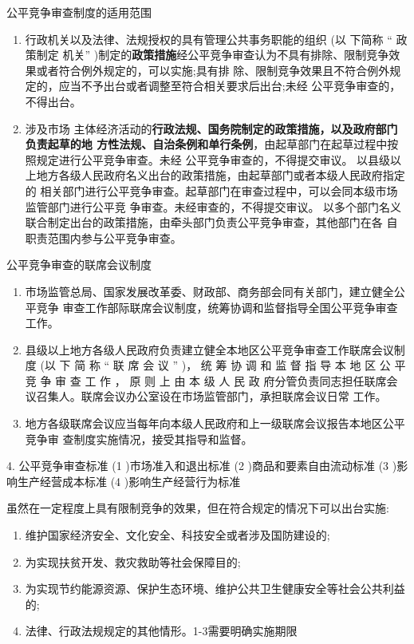 \documentclass[UTF8,12pt]{ctexart}
\numberwithin{equation}{section} %
\numberwithin{figure}{section}
\numberwithin{table}{section}
\begin{document}
	公平竞争审查制度的适用范围
	\begin{enumerate}
		\item 行政机关以及法律、法规授权的具有管理公共事务职能的组织 (以 下简称 “ 政策制定 机关” )制定的\textbf{政策措施}经公平竞争审查认为不具有排除、限制竞争效果或者符合例外规定的，可以实施;具有排 除、限制竞争效果且不符合例外规定的，应当不予出台或者调整至符合相关要求后出台;未经 公平竞争审查的，不得出台。
		
		\item 涉及市场 主体经济活动的\textbf{行政法规、国务院制定的政策措施，以及政府部门负责起草的地 方性法规、自治条例和单行条例}，由起草部门在起草过程中按照规定进行公平竞争审查。未经 公平竞争审查的，不得提交审议。 以县级以上地方各级人民政府名义出台的政策措施，由起草部门或者本级人民政府指定的 相关部门进行公平竞争审查。起草部门在审查过程中，可以会同本级市场监管部门进行公平竞 争审查。未经审查的，不得提交审议。 以多个部门名义联合制定出台的政策措施，由牵头部门负责公平竞争审查，其他部门在各 自职责范围内参与公平竞争审查。
	\end{enumerate}
	
	
	公平竞争审查的联席会议制度
	\begin{enumerate}
		\item 市场监管总局、国家发展改革委、财政部、商务部会同有关部门，建立健全公平竞争 审查工作部际联席会议制度，统筹协调和监督指导全国公平竞争审查工作。
		
		\item 县级以上地方各级人民政府负责建立健全本地区公平竞争审查工作联席会议制度 (以 下 简 称 “ 联 席 会 议 ” )， 统 筹 协 调 和 监 督 指 导 本 地 区 公 平 竞 争 审 查 工 作 ， 原 则 上 由 本 级 人 民 政 府分管负责同志担任联席会议召集人。联席会议办公室设在市场监管部门，承担联席会议日常 工作。
		
		\item 地方各级联席会议应当每年向本级人民政府和上一级联席会议报告本地区公平竞争审 查制度实施情况，接受其指导和监督。
	\end{enumerate}
	
	4. 公平竞争审查标准
	(1 )市场准入和退出标准
	(2 )商品和要素自由流动标准 
	(3 )影响生产经营成本标准
	(4 )影响生产经营行为标准
	
	
	虽然在一定程度上具有限制竞争的效果，但在符合规定的情况下可以出台实施: 
	\begin{enumerate}
		\item 维护国家经济安全、文化安全、科技安全或者涉及国防建设的;
		
		\item 为实现扶贫开发、救灾救助等社会保障目的;
		
		\item 为实现节约能源资源、保护生态环境、维护公共卫生健康安全等社会公共利益的; 
		
		\item 法律、行政法规规定的其他情形。1-3需要明确实施期限
	\end{enumerate}
	
\end{document}
